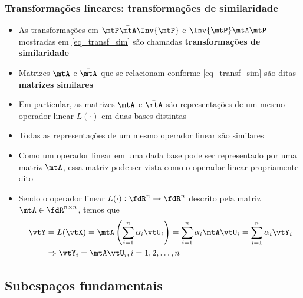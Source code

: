 \begin{frame}
  \frametitle{Transformações lineares: transformações de similaridade}
  \begin{itemize}\small
    \item As transformações em $\mtP\bar{\mtA}\Inv{\mtP}$ e $\Inv{\mtP}\mtA\mtP$ mostradas em \eqref{eq_transf_sim} são chamadas \textbf{\alert{transformações de similaridade}}
    \item Matrizes $\mtA$ e $\bar{\mtA}$ que se relacionam conforme \eqref{eq_transf_sim} são ditas \textbf{\alert{matrizes similares}}
    \item Em particular, as matrizes $\mtA$ e $\bar{\mtA}$ são representações de um mesmo operador linear $L(\cdot)$ em duas bases distintas
    \item Todas as representações de um mesmo operador linear são similares
    \item Como um operador linear em uma dada base pode ser representado por uma matriz $\mtA$, essa matriz pode ser vista como o operador linear propriamente dito
    \item Sendo o operador linear $L(\cdot) : \fdR^n \rightarrow \fdR^n$ descrito pela matriz $\mtA \in \fdR^{n \times n}$, temos que
    \begin{equation}
      \begin{split}
        \vtY &= L(\vtX) = \mtA\left(\sum\limits_{i=1}^n \alpha_i\vtU_i\right) = \sum\limits_{i=1}^n \alpha_i\mtA\vtU_i = \sum\limits_{i=1}^n \alpha_i\vtY_i \\
        & \Rightarrow \vtY_i = \mtA\vtU_i, i = 1, 2, \ldots, n
      \end{split}
    \end{equation}
  \end{itemize}
\end{frame}


\subsection{Subespaços fundamentais}

